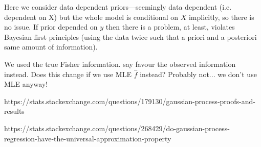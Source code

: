 Here we consider data dependent priors---seemingly data dependent (i.e. dependent on X) but the whole model is conditional on $X$ implicitly, so there is no issue.
If prior depended on $y$ then there is a problem, at least, violates Bayesian first principles (using the data twice such that a priori and a posteriori same amount of information).

We used the true Fisher information. \citet{efron1978assessing} say favour the observed information instead. Does this change if we use MLE $\hat f$ instead? Probably not... we don't use MLE anyway!

https://stats.stackexchange.com/questions/179130/gaussian-process-proofs-and-results

https://stats.stackexchange.com/questions/268429/do-gaussian-process-regression-have-the-universal-approximation-property
